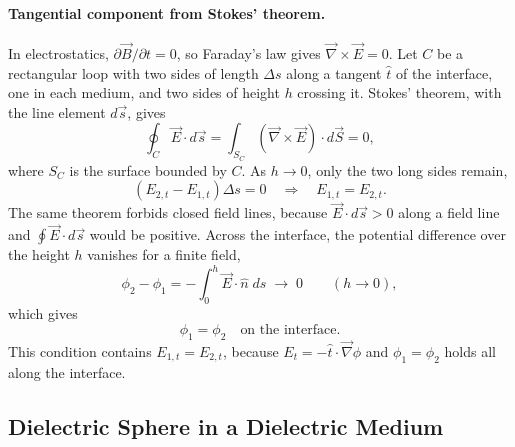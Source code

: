 \paragraph{Tangential component from Stokes' theorem.}
In electrostatics, $\partial\vec B/\partial t = 0$, so Faraday's law gives $\vec\nabla\times\vec E = 0$. Let $C$ be a rectangular loop with two sides of length $\Delta s$ along a tangent $\hat t$ of the interface, one in each medium, and two sides of height $h$ crossing it. Stokes' theorem, with the line element $d\vec s$, gives
\begin{equation*}
    \oint_C \vec E\cdot d\vec s = \int_{S_C} \left(\vec\nabla\times\vec E\right)\cdot d\vec S = 0,
\end{equation*}
where $S_C$ is the surface bounded by $C$. As $h \to 0$, only the two long sides remain,
\begin{equation*}
    \left(E_{2,t} - E_{1,t}\right)\Delta s = 0
    \quad\Rightarrow\quad
    E_{1,t} = E_{2,t}.
\end{equation*}
The same theorem forbids closed field lines, because $\vec E\cdot d\vec s > 0$ along a field line and $\oint\vec E\cdot d\vec s$ would be positive. Across the interface, the potential difference over the height $h$ vanishes for a finite field,
\begin{equation*}
    \phi_2 - \phi_1 = -\int_0^h \vec E\cdot\hat n\;ds \;\longrightarrow\; 0 \qquad (h \to 0),
\end{equation*}
which gives
\begin{equation}
    \boxed{
    \phi_1 = \phi_2 \quad \text{on the interface}.
    }
\end{equation}
This condition contains $E_{1,t} = E_{2,t}$, because $E_t = -\hat t\cdot\vec\nabla\phi$ and $\phi_1 = \phi_2$ holds all along the interface.

\subsection{Dielectric Sphere in a Dielectric Medium}

